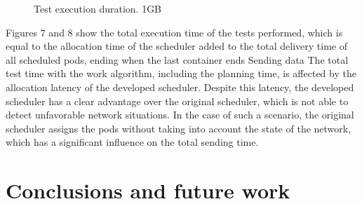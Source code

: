 \documentclass[conference]{IEEEtran}
\begin{document}
\begin{figure}[h]
\begin{center}
\strut{}
\caption{Test execution duration. 1GB}\label{fig:cluster}
\end{center}
\end{figure}

Figures 7 and 8 show the total execution time of the tests performed, which is equal to the allocation time of the scheduler added to the total delivery time of all scheduled pods, ending when the last container ends Sending data The total test time with the work algorithm, including the planning time, is affected by the allocation latency of the developed scheduler. Despite this latency, the developed scheduler has a clear advantage over the original scheduler, which is not able to detect unfavorable network situations. In the case of such a scenario, the original scheduler assigns the pods without taking into account the state of the network, which has a significant influence on the total sending time.

\section{Conclusions and future work}\label{sec:conc}
\end{document}
